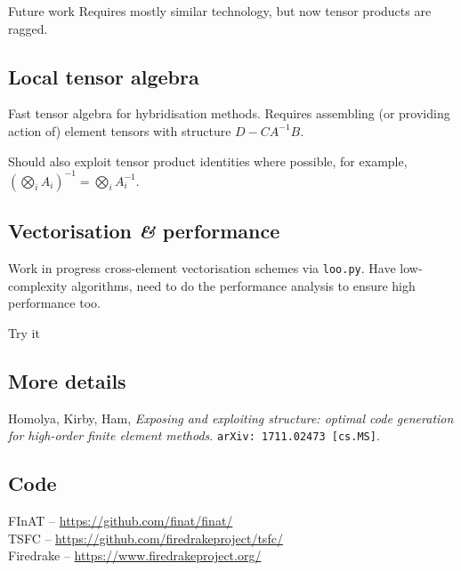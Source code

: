\documentclass[a0paper,portrait]{baposter}
\begin{document}
\begin{poster}
\begin{posterbox}[name=future, column=0, below=rules,
    span=3, height=0.235]{Future work}
    Requires mostly similar technology, but now tensor products are
    ragged.
    \vspace{-\baselineskip}
    \subsection*{Local tensor algebra}
    \vspace{-0.25\baselineskip}
    Fast tensor algebra for hybridisation methods.  Requires
    assembling (or providing action of) element tensors with
    structure $D - C A^{-1} B$.

    Should also exploit tensor product identities where possible,
    for example,
    $\left(\bigotimes_i A_i\right)^{-1} = \bigotimes_i A_i^{-1}$.
    \vspace{-\baselineskip}
    \subsection*{Vectorisation {\itshape\&} performance}
    \vspace{-0.25\baselineskip}
    Work in progress cross-element vectorisation schemes via
    \texttt{loo.py}.  Have low-complexity algorithms, need to do
    the performance analysis to ensure high performance too.
  \end{posterbox}    
  \begin{posterbox}[name=try, column=3, below=curl-curl,
    span=3, height=0.235]{Try it}
    \raggedright
    \subsection*{More details}
    \vspace{-0.25\baselineskip}
    Homolya, Kirby, Ham, \emph{Exposing and exploiting structure:
      optimal code generation for high-order finite element
      methods}. \texttt{arXiv:\,1711.02473\,[cs.MS]}.
    \vspace{-\baselineskip}
    \subsection*{Code}
    \vspace{-0.25\baselineskip}
    FInAT -- \url{https://github.com/finat/finat/}\\[0.25\baselineskip]
    TSFC -- \url{https://github.com/firedrakeproject/tsfc/}\\[0.25\baselineskip]
    Firedrake -- \url{https://www.firedrakeproject.org/}


\end{posterbox}
\end{poster}
\end{document}
